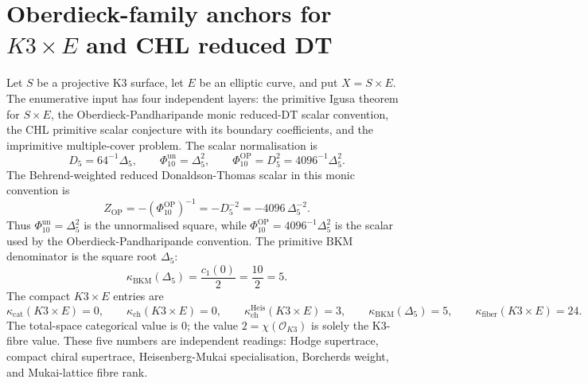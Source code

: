 \providecommand{\kBKM}{\kappa_{\mathrm{BKM}}}
\providecommand{\kch}{\kappa_{\mathrm{ch}}}
\providecommand{\kcat}{\kappa_{\mathrm{cat}}}
\providecommand{\kfib}{\kappa_{\mathrm{fiber}}}
\providecommand{\Z}{\mathbb{Z}}
\providecommand{\C}{\mathbb{C}}
\providecommand{\DT}{\mathrm{DT}}
\providecommand{\DTred}{Z^{\mathrm{red}}_{\mathrm{DT}}}
\providecommand{\PTred}{Z^{\mathrm{red}}_{\mathrm{PT}}}
\providecommand{\GWred}{Z^{\mathrm{red}}_{\mathrm{GW}}}
\providecommand{\Dfive}{D_5}
\providecommand{\DeltaFive}{\Delta_5}
\providecommand{\PhiTenUn}{\Phi_{10}^{\mathrm{un}}}
\providecommand{\PhiTenOP}{\Phi_{10}^{\mathrm{OP}}}
\providecommand{\ZOP}{Z_{\mathrm{OP}}}
\providecommand{\chiTen}{\chi_{10}}
\providecommand{\phizo}{\phi_{0,1}}
\providecommand{\BKM}{\mathrm{BKM}}
\providecommand{\CoHA}{\mathrm{CoHA}}
\providecommand{\Yplus}{Y^+}
\providecommand{\Eone}{E_1}
\providecommand{\Etwo}{E_2}
\providecommand{\Woneinfty}{\mathcal W_{1+\infty}}

\section*{Oberdieck-family anchors for \(K3\times E\) and CHL reduced DT}
\label{sec:oberdieck-family-primary-literature}

Let \(S\) be a projective K3 surface, let \(E\) be an elliptic curve, and
put \(X=S\times E\). The enumerative input has four independent layers:
the primitive Igusa theorem for \(S\times E\), the
Oberdieck-Pandharipande monic reduced-DT scalar convention, the CHL
primitive scalar conjecture with its boundary coefficients, and the
imprimitive multiple-cover problem. The scalar normalisation is
\[
  \Dfive = 64^{-1}\DeltaFive,\qquad
  \PhiTenUn = \DeltaFive^2,\qquad
  \PhiTenOP = \Dfive^2 = 4096^{-1}\DeltaFive^2 .
\]
The Behrend-weighted reduced Donaldson-Thomas scalar in this monic
convention is
\[
  \ZOP
  =
  -(\PhiTenOP)^{-1}
  =
  -\Dfive^{-2}
  =
  -4096\,\DeltaFive^{-2}.
\]
Thus \(\PhiTenUn=\DeltaFive^2\) is the unnormalised square, while
\(\PhiTenOP=4096^{-1}\DeltaFive^2\) is the scalar used by the
Oberdieck-Pandharipande convention. The primitive \(\BKM\) denominator is
the square root \(\DeltaFive\):
\[
  \kBKM(\DeltaFive)
  =
  \frac{c_1(0)}{2}
  =
  \frac{10}{2}
  =
  5 .
\]
The compact \(K3\times E\) entries are
\[
  \kcat(K3\times E)=0,\qquad
  \kch(K3\times E)=0,\qquad
  \kch^{\mathrm{Heis}}(K3\times E)=3,\qquad
  \kBKM(\DeltaFive)=5,\qquad
  \kfib(K3\times E)=24 .
\]
The total-space categorical value is \(0\); the value
\(2=\chi(\mathcal O_{K3})\) is solely the K3-fibre value. These five
numbers are independent readings: Hodge supertrace, compact chiral
supertrace, Heisenberg-Mukai specialisation, Borcherds weight, and
Mukai-lattice fibre rank.

